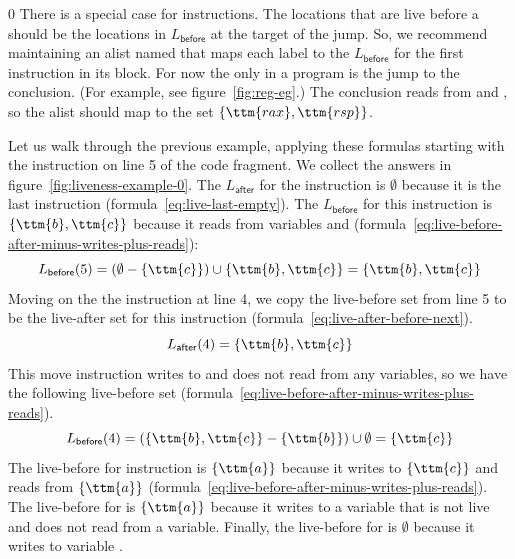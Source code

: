 \documentclass[7x10]{TimesAPriori_MIT}%
\def\racketEd{0}
\def\edition{1}
\numberwithin{theorem}{chapter}
\numberwithin{definition}{chapter}
\numberwithin{equation}{chapter}
\begin{document}
{\if\edition\racketEd
%
There is a special case for  instructions.  The locations
that are live before a  should be the locations in
$L_{\mathsf{before}}$ at the target of the jump. So, we recommend
maintaining an alist named  that maps each label to
the $L_{\mathsf{before}}$ for the first instruction in its block. For
now the only  in a \LangXVar{} program is the jump to the
conclusion. (For example, see figure~\ref{fig:reg-eg}.)  The
conclusion reads from  and , so the alist should map
 to the set $\{\ttm{rax},\ttm{rsp}\}$.
%
\fi}

Let us walk through the previous example, applying these formulas
starting with the instruction on line 5 of the code fragment. We
collect the answers in figure~\ref{fig:liveness-example-0}.  The
$L_{\mathsf{after}}$ for the  instruction is
$\emptyset$ because it is the last instruction
(formula~\eqref{eq:live-last-empty}).  The $L_{\mathsf{before}}$ for
this instruction is $\{\ttm{b},\ttm{c}\}$ because it reads from
variables  and 
(formula~\eqref{eq:live-before-after-minus-writes-plus-reads}):
\[
   L_{\mathsf{before}}(5) = (\emptyset - \{\ttm{c}\}) \cup \{ \ttm{b}, \ttm{c} \} = \{ \ttm{b}, \ttm{c} \}
\]
Moving on the the instruction  at line 4, we copy
the live-before set from line 5 to be the live-after set for this
instruction (formula~\eqref{eq:live-after-before-next}).
\[
  L_{\mathsf{after}}(4) = \{ \ttm{b}, \ttm{c} \}
\]
This move instruction writes to  and does not read from any
variables, so we have the following live-before set
(formula~\eqref{eq:live-before-after-minus-writes-plus-reads}).
\[
  L_{\mathsf{before}}(4) = (\{\ttm{b},\ttm{c}\} - \{\ttm{b}\}) \cup \emptyset = \{ \ttm{c} \}
\]
The live-before for instruction 
is $\{\ttm{a}\}$ because it writes to $\{\ttm{c}\}$ and reads from $\{\ttm{a}\}$
(formula~\eqref{eq:live-before-after-minus-writes-plus-reads}).  The
live-before for  is $\{\ttm{a}\}$ because it writes to a
variable that is not live and does not read from a variable.
Finally, the live-before for  is $\emptyset$
because it writes to variable .
\end{document}
